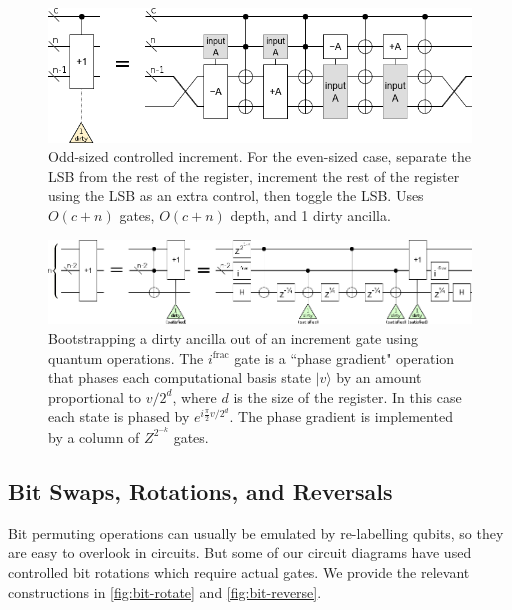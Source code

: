\documentclass[twocolumn,longbibliography]{quantumarticle-customized}
\begin{document}
\begin{figure}
  \centering
  \includegraphics[width=\linewidth]{assets/controlled-increment-odd.png}
  \caption{
    Odd-sized controlled increment.
    For the even-sized case, separate the LSB from the rest of the register, increment the rest of the register using the LSB as an extra control, then toggle the LSB.
    Uses $O(c+n)$ gates, $O(c+n)$ depth, and 1 dirty ancilla.
  }
  \label{fig:controlled-increment-odd}
\end{figure}

\begin{figure}
  \centering
  \includegraphics[width=\linewidth]{assets/ancilla-bootstrap.png}
  \caption{ Bootstrapping a dirty ancilla out of an increment gate using quantum operations.
  The $i^{\text{frac}}$ gate is a ``phase gradient" operation that phases each computational basis state $|v\rangle$ by an amount proportional to $v/2^d$, where $d$ is the size of the register.
  In this case each state is phased by $e^{i \frac{\pi}{2} v/2^d}$.
  The phase gradient is implemented by a column of $Z^{2^{-k}}$ gates.}
  \label{fig:bootstrap-ancilla}
\end{figure}


\subsection{Bit Swaps, Rotations, and Reversals}

Bit permuting operations can usually be emulated by re-labelling qubits, so they are easy to overlook in circuits.
But some of our circuit diagrams have used controlled bit rotations which require actual gates.
We provide the relevant constructions in \autoref{fig:bit-rotate} and \autoref{fig:bit-reverse}.
\end{document}
